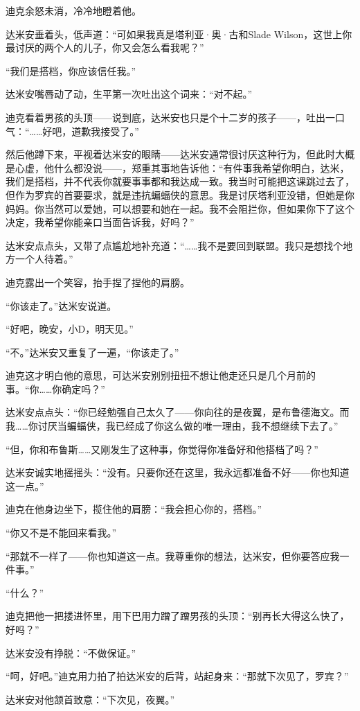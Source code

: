 \documentclass[../main]{subfiles}
\begin{document}
迪克余怒未消，冷冷地瞪着他。

达米安垂着头，低声道：“可如果我真是塔利亚·奥·古和Slade
Wilson，这世上你最讨厌的两个人的儿子，你又会怎么看我呢？”

“我们是搭档，你应该信任我。”

达米安嘴唇动了动，生平第一次吐出这个词来：“对不起。”

迪克看着男孩的头顶——说到底，达米安也只是个十二岁的孩子——，吐出一口气：“……好吧，道歉我接受了。”

然后他蹲下来，平视着达米安的眼睛——达米安通常很讨厌这种行为，但此时大概是心虚，他什么都没说——，郑重其事地告诉他：“有件事我希望你明白，达米，我们是搭档，并不代表你就要事事都和我达成一致。我当时可能把这课跳过去了，但作为罗宾的首要要求，就是违抗蝙蝠侠的意思。我是讨厌塔利亚没错，但她是你妈妈。你当然可以爱她，可以想要和她在一起。我不会阻拦你，但如果你下了这个决定，我希望你能亲口当面告诉我，好吗？”

达米安点点头，又带了点尴尬地补充道：“……我不是要回到联盟。我只是想找个地方一个人待着。”

迪克露出一个笑容，抬手捏了捏他的肩膀。

“你该走了。”达米安说道。

“好吧，晚安，小D，明天见。”

“不。”达米安又重复了一遍，“你该走了。”

迪克这才明白他的意思，可达米安别别扭扭不想让他走还只是几个月前的事。“你……你确定吗？”

达米安点点头：“你已经勉强自己太久了——你向往的是夜翼，是布鲁德海文。而我……你讨厌当蝙蝠侠，我已经成了你这么做的唯一理由，我不想继续下去了。”

“但，你和布鲁斯……又刚发生了这种事，你觉得你准备好和他搭档了吗？”

达米安诚实地摇摇头：“没有。只要你还在这里，我永远都准备不好——你也知道这一点。”

迪克在他身边坐下，揽住他的肩膀：“我会担心你的，搭档。”

“你又不是不能回来看我。”

“那就不一样了——你也知道这一点。我尊重你的想法，达米安，但你要答应我一件事。”

“什么？”

迪克把他一把搂进怀里，用下巴用力蹭了蹭男孩的头顶：“别再长大得这么快了，好吗？”

达米安没有挣脱：“不做保证。”

“呵，好吧。”迪克用力拍了拍达米安的后背，站起身来：“那就下次见了，罗宾？”

达米安对他颔首致意：“下次见，夜翼。”
\end{document}
